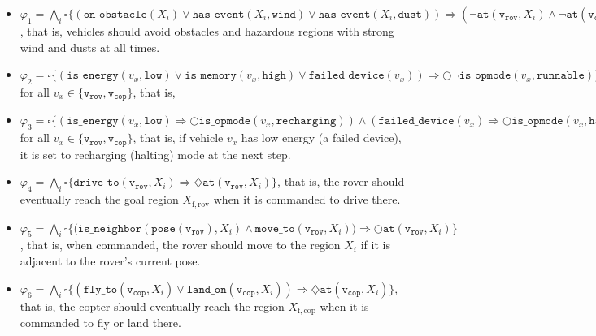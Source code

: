 \documentclass[10pt,letterpaper]{article}
\newcommand{\fOnObstacle}[1]{\ensuremath{ \mathtt{on\_obstacle} ( #1 ) }}
\newcommand{\fHasEvent}[2]{\ensuremath{ \mathtt{has\_event} ( #1, #2 ) }}
\newcommand{\fIsOpmode}[2]{\ensuremath{ \mathtt{is\_opmode} (#1,#2) }}
\newcommand{\fAtPose}[2]{\ensuremath{ \mathtt{at} ( #1, #2 ) }}
\newcommand{\fPose}[1]{\ensuremath{ \mathtt{pose} (#1)}}
\newcommand{\fIsMemory}[2]{\ensuremath{ \mathtt{is\_memory} (#1,#2)}}
\newcommand{\fIsEnergy}[2]{\ensuremath{ \mathtt{is\_energy} (#1,#2) }}
\newcommand{\fFailedDevice}[1]{\ensuremath{ \mathtt{failed\_device} (#1) }}
\newcommand{\fIsNeighbor}[2]{\ensuremath{ \mathtt{is\_neighbor} (#1, #2) }}
\newcommand{\fCommandDriveTo}[2]{\ensuremath{ \mathtt{drive\_to} (#1, #2) }}
\newcommand{\fCommandFlyTo}[2]{\ensuremath{ \mathtt{fly\_to} (#1, #2) }}
\newcommand{\fCommandLandOn}[2]{\ensuremath{ \mathtt{land\_on} (#1, #2) }}
\newcommand{\fCommandMoveTo}[2]{\ensuremath{ \mathtt{move\_to} (#1, #2) }}
\newcommand{\vRover}{\ensuremath{\mathtt{v_{rov}}}}
\newcommand{\vCopter}{\ensuremath{\mathtt{v_{cop}}}}
\newcommand{\cnstWind}{\ensuremath{\mathtt{wind}}}
\newcommand{\cnstDust}{\ensuremath{\mathtt{dust}}}
\newcommand{\cnstLow}{\ensuremath{\mathtt{low}}}
\newcommand{\cnstHigh}{\ensuremath{\mathtt{high}}}
\newcommand{\cnstRunnable}{\ensuremath{\mathtt{runnable}}}
\newcommand{\cnstRecharging}{\ensuremath{\mathtt{recharging}}}
\newcommand{\cnstHalting}{\ensuremath{\mathtt{halting}}}
\newcommand{\vXGoalRover}{\ensuremath{X_{\mathrm{f, rov}}}}
\newcommand{\vXGoalCopter}{\ensuremath{X_{\mathrm{f, cop}}}}
\begin{document}
\begin{itemize}
	\item $\varphi_{1} = \bigwedge_{i} \square \bigl\{ ( \fOnObstacle{X_{i}} \lor \fHasEvent{X_{i}}{\cnstWind} \lor \fHasEvent{X_{i}}{\cnstDust} ) \Rightarrow (\neg\fAtPose{\vRover}{X_{i}} \land \neg\fAtPose{\vCopter}{X_{i}} ) \bigr\}$, that is, vehicles should avoid obstacles and hazardous regions with strong wind and dusts at all times.
		
	
	\item $\varphi_{2} = \square \bigl\{  \left( \fIsEnergy{v_{x}}{\cnstLow}  \lor \fIsMemory{v_{x}}{\cnstHigh} \lor \fFailedDevice{v_{x}} \right)\Rightarrow \bigcirc \neg\fIsOpmode{v_{x}}{\cnstRunnable} \bigr\}$ for all  $v_{x} \in \{\vRover, \vCopter \}$, that is, 
		
	\item $\varphi_{3} =  \square \bigl\{  \left( \fIsEnergy{v_{x}}{\cnstLow}  \Rightarrow \bigcirc \fIsOpmode{v_{x}}{\cnstRecharging} \right) \land \left( \fFailedDevice{v_{x}}  \Rightarrow \bigcirc \fIsOpmode{v_{x}}{\cnstHalting} \right) \bigr\}$ for all  $v_{x} \in \{\vRover, \vCopter \}$, that is, if vehicle $v_{x}$ has low energy (a failed device), it is set to recharging (halting) mode  at the next step.
		
		
	\item $\varphi_{4} = \bigwedge_{i} \square \bigl\{ \fCommandDriveTo{\vRover}{X_{i}} \Rightarrow \diamondsuit \fAtPose{\vRover}{X_{i}} \bigr\} $, that is, the rover should eventually reach the goal region $\vXGoalRover$ when it is commanded to drive there.
	
	\item $\varphi_{5} = \bigwedge_{i} \square \bigl\{  \bigl( \fIsNeighbor{\fPose{\vRover}}{X_{i}}  \land \fCommandMoveTo{\vRover}{X_{i}} \bigr) \Rightarrow  \bigcirc \fAtPose{\vRover}{X_{i}} \bigr\}$, that is, when commanded, the rover should move to the region $X_{i}$ if it is adjacent to the rover's current pose.  
	
	
	\item $\varphi_{6} = \bigwedge_{i} \square \bigl\{ ( \fCommandFlyTo{\vCopter}{X_{i}} \lor \fCommandLandOn{\vCopter}{X_{i}} ) \Rightarrow \diamondsuit \fAtPose{\vCopter}{X_{i}} \bigr\} $, that is, the copter should eventually reach the region $\vXGoalCopter$ when it is commanded to fly or land there.


\end{itemize}
\end{document}
